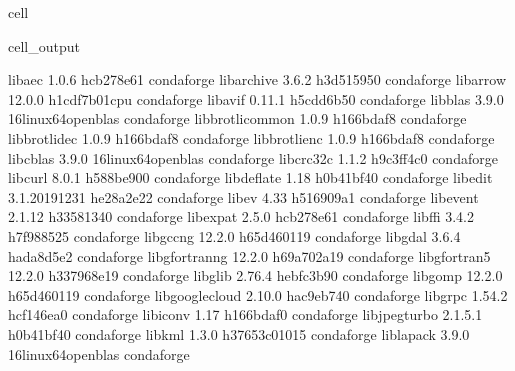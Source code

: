 \documentclass[letterpaper,table,10pt,english]{jupyterBook}
\begin{document}
\begin{sphinxuseclass}{cell}
\begin{sphinxVerbatimOutput}
\begin{sphinxuseclass}{cell_output}
\begin{sphinxVerbatim}[commandchars=\\\{\}]
libaec                    1.0.6                hcb278e6\PYGZus{}1    conda\PYGZhy{}forge
libarchive                3.6.2                h3d51595\PYGZus{}0    conda\PYGZhy{}forge
libarrow                  12.0.0           h1cdf7b0\PYGZus{}1\PYGZus{}cpu    conda\PYGZhy{}forge
libavif                   0.11.1               h5cdd6b5\PYGZus{}0    conda\PYGZhy{}forge
libblas                   3.9.0           16\PYGZus{}linux64\PYGZus{}openblas    conda\PYGZhy{}forge
libbrotlicommon           1.0.9                h166bdaf\PYGZus{}8    conda\PYGZhy{}forge
libbrotlidec              1.0.9                h166bdaf\PYGZus{}8    conda\PYGZhy{}forge
libbrotlienc              1.0.9                h166bdaf\PYGZus{}8    conda\PYGZhy{}forge
libcblas                  3.9.0           16\PYGZus{}linux64\PYGZus{}openblas    conda\PYGZhy{}forge
libcrc32c                 1.1.2                h9c3ff4c\PYGZus{}0    conda\PYGZhy{}forge
libcurl                   8.0.1                h588be90\PYGZus{}0    conda\PYGZhy{}forge
libdeflate                1.18                 h0b41bf4\PYGZus{}0    conda\PYGZhy{}forge
libedit                   3.1.20191231         he28a2e2\PYGZus{}2    conda\PYGZhy{}forge
libev                     4.33                 h516909a\PYGZus{}1    conda\PYGZhy{}forge
libevent                  2.1.12               h3358134\PYGZus{}0    conda\PYGZhy{}forge
libexpat                  2.5.0                hcb278e6\PYGZus{}1    conda\PYGZhy{}forge
libffi                    3.4.2                h7f98852\PYGZus{}5    conda\PYGZhy{}forge
libgcc\PYGZhy{}ng                 12.2.0              h65d4601\PYGZus{}19    conda\PYGZhy{}forge
libgdal                   3.6.4                hada8d5e\PYGZus{}2    conda\PYGZhy{}forge
libgfortran\PYGZhy{}ng            12.2.0              h69a702a\PYGZus{}19    conda\PYGZhy{}forge
libgfortran5              12.2.0              h337968e\PYGZus{}19    conda\PYGZhy{}forge
libglib                   2.76.4               hebfc3b9\PYGZus{}0    conda\PYGZhy{}forge
libgomp                   12.2.0              h65d4601\PYGZus{}19    conda\PYGZhy{}forge
libgoogle\PYGZhy{}cloud           2.10.0               hac9eb74\PYGZus{}0    conda\PYGZhy{}forge
libgrpc                   1.54.2               hcf146ea\PYGZus{}0    conda\PYGZhy{}forge
libiconv                  1.17                 h166bdaf\PYGZus{}0    conda\PYGZhy{}forge
libjpeg\PYGZhy{}turbo             2.1.5.1              h0b41bf4\PYGZus{}0    conda\PYGZhy{}forge
libkml                    1.3.0             h37653c0\PYGZus{}1015    conda\PYGZhy{}forge
liblapack                 3.9.0           16\PYGZus{}linux64\PYGZus{}openblas    conda\PYGZhy{}forge

\end{sphinxVerbatim}
\end{sphinxuseclass}
\end{sphinxVerbatimOutput}
\end{sphinxuseclass}
\end{document}
